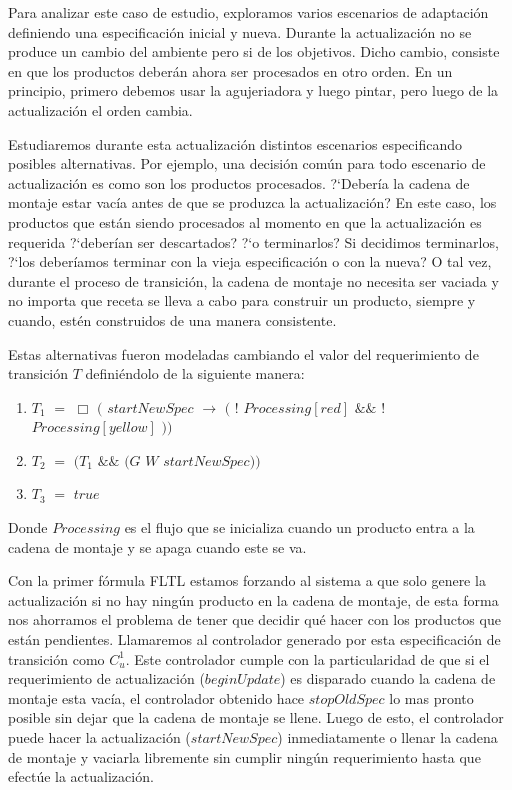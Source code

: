 Para analizar este caso de estudio, exploramos varios escenarios de adaptación definiendo una especificación inicial y
nueva. Durante la actualización no se produce un cambio del ambiente pero si de los objetivos. Dicho cambio, consiste en
que los productos deberán ahora ser procesados en otro orden. En un principio, primero debemos usar la agujeriadora y
luego pintar, pero luego de la actualización el orden cambia. 

Estudiaremos durante esta actualización distintos escenarios especificando posibles alternativas. Por ejemplo, una
decisión común para todo escenario de actualización es como son los productos procesados. ?`Debería la cadena de montaje
estar vacía antes de que se produzca la actualización? En este caso, los productos que están siendo procesados al
momento en que la actualización es requerida ?`deberían ser descartados? ?`o terminarlos? Si decidimos terminarlos,
?`los deberíamos terminar con la vieja especificación o con la nueva? O tal vez, durante el proceso de transición, la
cadena de montaje no necesita ser vaciada y no importa que receta se lleva a cabo para construir un producto, siempre y
cuando, estén construidos de una manera consistente. 

Estas alternativas fueron modeladas cambiando el valor del requerimiento de transición $T$ definiéndolo de la siguiente
manera:

\begin{enumerate}
\item $T_1$ $=$ $\Box$ $($ $startNewSpec$ $\rightarrow$ $($ $!$ $Processing[red]$ $\&\&$ $!$ $Processing[yellow]$ $))$ 
\item $T_2$ $=$ $(T_1$ $\&\&$ $($$G$ $W$ $startNewSpec))$
\item $T_3$ $=$ $true$
\end{enumerate}

Donde $Processing$ es el flujo que se inicializa cuando un producto entra a la cadena de montaje y se apaga cuando este
se va.

Con la primer fórmula FLTL estamos forzando al sistema a que solo genere la actualización si no hay ningún producto en
la cadena de montaje, de esta forma nos ahorramos el problema de tener que decidir qué hacer con los productos que están
pendientes. Llamaremos al controlador generado por esta especificación de transición como $C_u^1$. Este controlador
cumple con la particularidad de que si el requerimiento de actualización ($beginUpdate$) es disparado cuando la cadena
de montaje esta vacía, el controlador obtenido hace $stopOldSpec$ lo mas pronto posible sin dejar que la cadena de
montaje se llene. Luego de esto, el controlador puede hacer la actualización ($startNewSpec$) inmediatamente o llenar la
cadena de montaje y vaciarla libremente sin cumplir ningún requerimiento hasta que efectúe la actualización.

